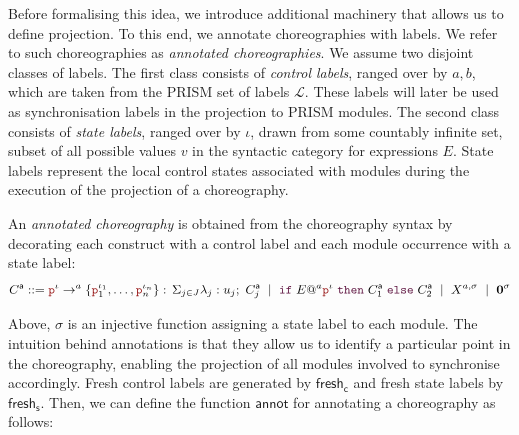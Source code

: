 Before formalising this idea, we introduce additional machinery that
allows us to define projection. To this end, we annotate choreographies
with labels. We refer to such choreographies as \emph{annotated
choreographies}. 
We assume two disjoint classes of labels. The first class consists of
\emph{control labels}, ranged over by $a,b$, which are taken from the
PRISM set of labels $\mathcal L$. These labels will later be used as
synchronisation labels in the projection to PRISM modules. The second
class consists of \emph{state labels}, ranged over by $\iota$, drawn
from some countably infinite set, subset of all possible values $v$ in
the syntactic category for expressions $E$. State labels represent the
local control states associated with modules during the execution of
the projection of a choreography.
\newcommand{\anno}[1]{{#1}^{\mathsf a}}
\begin{defi}
  An \emph{annotated choreography} is obtained from the choreography
  syntax by decorating each construct with a control label and each
  module occurrence with a state label:
  \[\small
    \anno{C} ::= 
      \interactl{\nr^{\iota}}a{\nr_1^{\iota_1},\ldots,\nr_n^{\iota_n}}
      \ \mid\ 
      \ifTEl{E}a{\nr^{\iota}}{\anno{C}_1}{\anno{C}_2}
      \ \mid\ 
      X^{a,\sigma}
      \ \mid\ 
      \CEnd^{\sigma}
  \]
\end{defi}
Above, $\sigma$ is an injective function assigning a state label to
each module.  The intuition behind annotations is that they allow us
to identify a particular point in the choreography, enabling the
projection of all modules involved to synchronise accordingly.
Fresh control labels are generated by $\mathsf{fresh}_{\mathsf c}$ and
fresh state labels by $\mathsf{fresh}_{\mathsf s}$. Then, we can
define the function $\mathsf{annot}$ for annotating a choreography as
follows:
